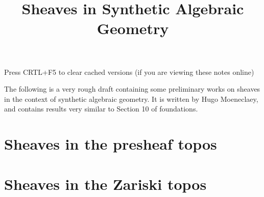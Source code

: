 \documentclass{../util/zariski}
\title{Sheaves in Synthetic Algebraic Geometry}
\begin{document}
\maketitle

\begin{center}
  \color{purple}
  \large{Press CRTL+F5 to clear cached versions}
  \large{(if you are viewing these notes online)}
\end{center}

The following is a very rough draft containing some preliminary works on sheaves in the context of synthetic algebraic geometry. It is written by Hugo Moeneclaey, and contains results very similar to Section 10 of foundations.

\tableofcontents

\section{Sheaves in the presheaf topos}


\section{Sheaves in the Zariski topos}




\printindex

\printbibliography
\end{document}
